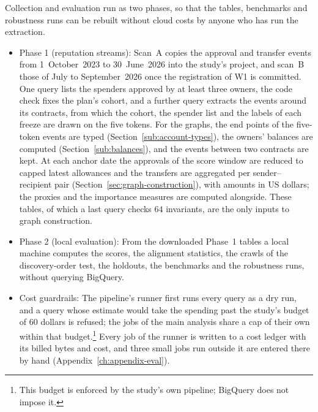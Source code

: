 
Collection and evaluation run as two phases, so that the tables, benchmarks and robustness runs can be rebuilt without cloud costs by anyone who has run the extraction.

\begin{itemize}
\item Phase 1 (reputation streams): Scan~A copies the approval and transfer events from 1~October~2023 to 30~June~2026 into the study's project, and scan~B those of July to September~2026 once the registration of W1 is committed. One query lists the spenders approved by at least three owners, the code check fixes the plan's cohort, and a further query extracts the events around its contracts, from which the cohort, the spender list and the labels of each freeze are drawn on the five tokens. For the graphs, the end points of the five-token events are typed (Section~\ref{sub:account-types}), the owners' balances are computed (Section~\ref{sub:balances}), and the events between two contracts are kept. At each anchor date the approvals of the score window are reduced to capped latest allowances and the transfers are aggregated per sender--recipient pair (Section~\ref{sec:graph-construction}), with amounts in US dollars; the proxies and the importance measures are computed alongside. These tables, of which a last query checks $64$ invariants, are the only inputs to graph construction.

\item Phase 2 (local evaluation): From the downloaded Phase~1 tables a local machine computes the scores, the alignment statistics, the crawls of the discovery-order test, the holdouts, the benchmarks and the robustness runs, without querying BigQuery.

\item Cost guardrails: The pipeline's runner first runs every query as a dry run, and a query whose estimate would take the spending past the study's budget of $60$ dollars is refused; the jobs of the main analysis share a cap of their own within that budget.\footnote{This budget is enforced by the study's own pipeline; BigQuery does not impose it.} Every job of the runner is written to a cost ledger with its billed bytes and cost, and three small jobs run outside it are entered there by hand (Appendix~\ref{ch:appendix-eval}).

\end{itemize}

